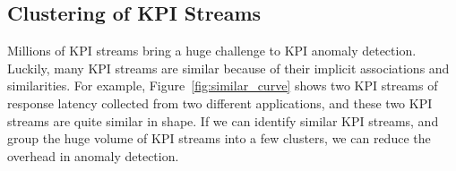 \subsection{Clustering of KPI Streams}
\label{subsec:background}
Millions of KPI streams bring a huge challenge to KPI anomaly detection.
Luckily, many KPI streams are similar because of their implicit associations and similarities.
For example, Figure~\ref{fig:similar_curve} shows two KPI streams of response latency collected from two different applications, and these two KPI streams are quite similar in shape.
If we can identify similar KPI streams, and group the huge volume of KPI streams into a few clusters, we can reduce the overhead in anomaly detection.


